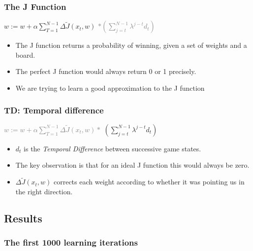 \documentclass[10pt]{beamer}
\begin{document}
    \begin{frame}
      \frametitle{The J Function}
      \begin{center} $\displaystyle w := w + \alpha \sum_{T=1}^{N-1} \Delta \tilde{J}(x_t,w)$  \textcolor{gray}{$ * ( \sum _{j=t} ^{N-1} \lambda ^{j-t} d_t )$} \end{center}
      \begin{itemize}
        \item<1-> The J function returns a probability of winning, given a set of weights and a board.
        \item<1-> The perfect J function would always return 0 or 1 precisely.
        \item<1-> We are trying to learn a good approximation to the J function
      \end{itemize}
    \end{frame}
    
    \begin{frame}
      \frametitle{TD: Temporal difference}
      \begin{center} \textcolor{gray}{$\displaystyle w := w + \alpha \sum_{T=1}^{N-1} \Delta \tilde{J}(x_t,w) *$}  $( \sum _{j=t} ^{N-1} \lambda ^{j-t} d_t )$ \end{center}
      \begin{itemize}
        \item<1-> $d_t$ is the \emph{Temporal Difference} between successive game states.
        \item<1-> The key observation is that for an ideal J function this would always be zero.
        \item<1-> $\Delta \tilde{J}(x_t,w)$ corrects each weight according to whether it was pointing us in the right direction.
      \end{itemize}
    \end{frame}

\subsection{Results}

\begin{frame}
  \frametitle{The first 1000 learning iterations}
\end{frame}
\end{document}
